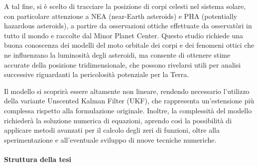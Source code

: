\documentclass[12pt,a4paper,openright,twoside]{book}
\begin{document}
A tal fine, si è scelto di tracciare la posizione di corpi celesti nel sistema solare, con particolare attenzione a NEA (near-Earth asteroids) e PHA (potentially hazardous asteroids), a partire da osservazioni ottiche effettuate da osservatòri in tutto il mondo e raccolte dal Minor Planet Center. Questo studio richiede una buona conoscenza dei modelli del moto orbitale dei corpi e dei fenomeni ottici che ne influenzano la luminosità degli asteroidi, ma consente di ottenere stime accurate della posizione tridimensionale, che possono rivelarsi utili per analisi successive riguardanti la pericolosità potenziale per la Terra.

Il modello si scoprirà essere altamente non lineare, rendendo necessario l'utilizzo della variante Unscented Kalman Filter (UKF), che rappresenta un'estensione più complessa rispetto alla formulazione originale. Inoltre, la complessità del modello richiederà la soluzione numerica di equazioni, aprendo così la possibilità di applicare metodi avanzati per il calcolo degli zeri di funzioni, oltre alla sperimentazione e all'eventuale sviluppo di nuove tecniche numeriche.

\paragraph{Struttura della tesi}
\end{document}
